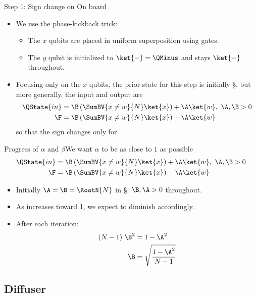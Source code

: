 \begin{Grover}
\begin{frame}{Step 1: Sign change on }{On board}
\Vskip{-3em}\begin{itemize}
    \item We use the phase-kickback trick:
    \begin{itemize}
        \item The $x$ qubits are placed in uniform superposition using \Hadamard{} gates.
        \item The $y$ qubit is initialized to $\ket{-}=\QMinus$ and stays $\ket{-}$ throughout.
    \end{itemize}
    \item Focusing only on the $x$ qubits, the prior state for this step is initially \S, but more generally, the input and output are
    \begin{align*}
      \QState{in} &=  \B \left(\SumBV{x\neq w}{N} \ket{x}\right) + \A\ket{w},\ \A,\B > 0 \\
           \F &= \B \left(\SumBV{x\neq w}{N} \ket{x}\right) - \A\ket{w}
    \end{align*}
        so that the sign changes only for 
\end{itemize}
    
\end{frame}
\begin{frame}{Progress of $\alpha$ and $\beta$}{We want $\alpha$ to be as close to $1$ as possible}
\Vskip{-3em}    {\small\begin{align*}
      \QState{in} &=  \B \left(\SumBV{x\neq w}{N} \ket{x}\right) + \A\ket{w},\ \A,\B > 0 \\
           \F &= \B \left(\SumBV{x\neq w}{N} \ket{x}\right) - \A\ket{w}
    \end{align*}}
\begin{itemize}
    \item Initially $\A=\B=\RootN{N}$ in \S.  $\B,\A > 0$ throughout.
    \item As \A{} increases toward 1, we expect \B{} to diminish accordingly.
    \item After each iteration:
    \begin{align*}
        (N-1)\ \B^{2} &= 1 - \A^{2}\\
        \B & = \sqrt{\frac{1-\A^{2}}{N-1}}
    \end{align*}
\end{itemize}
\end{frame}

\subsection*{Diffuser}


\end{Grover}
